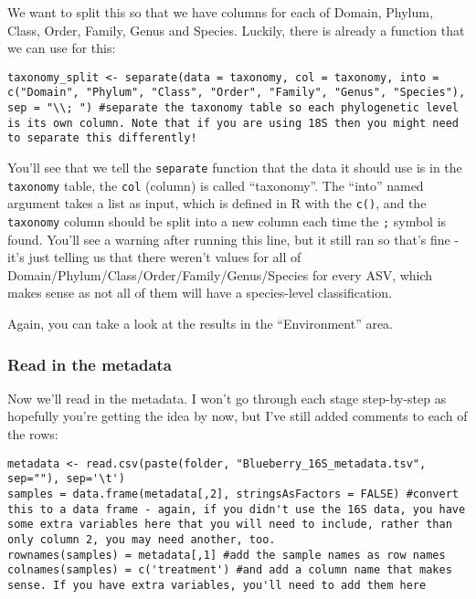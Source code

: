 \documentclass[
]{book}
\begin{document}
We want to split this so that we have columns for each of Domain, Phylum, Class, Order, Family, Genus and Species. Luckily, there is already a function that we can use for this:

\begin{verbatim}
taxonomy_split <- separate(data = taxonomy, col = taxonomy, into = c("Domain", "Phylum", "Class", "Order", "Family", "Genus", "Species"), sep = "\\; ") #separate the taxonomy table so each phylogenetic level is its own column. Note that if you are using 18S then you might need to separate this differently!
\end{verbatim}

You'll see that we tell the \texttt{separate} function that the data it should use is in the \texttt{taxonomy} table, the \texttt{col} (column) is called ``taxonomy''. The ``into'' named argument takes a list as input, which is defined in R with the \texttt{c()}, and the \texttt{taxonomy} column should be split into a new column each time the \texttt{;} symbol is found. You'll see a warning after running this line, but it still ran so that's fine - it's just telling us that there weren't values for all of Domain/Phylum/Class/Order/Family/Genus/Species for every ASV, which makes sense as not all of them will have a species-level classification.

Again, you can take a look at the results in the ``Environment'' area.

\subsubsection{Read in the metadata}\label{read-in-the-metadata}

Now we'll read in the metadata. I won't go through each stage step-by-step as hopefully you're getting the idea by now, but I've still added comments to each of the rows:

\begin{verbatim}
metadata <- read.csv(paste(folder, "Blueberry_16S_metadata.tsv", sep=""), sep='\t')
samples = data.frame(metadata[,2], stringsAsFactors = FALSE) #convert this to a data frame - again, if you didn't use the 16S data, you have some extra variables here that you will need to include, rather than only column 2, you may need another, too. 
rownames(samples) = metadata[,1] #add the sample names as row names
colnames(samples) = c('treatment') #and add a column name that makes sense. If you have extra variables, you'll need to add them here
\end{verbatim}
\end{document}
